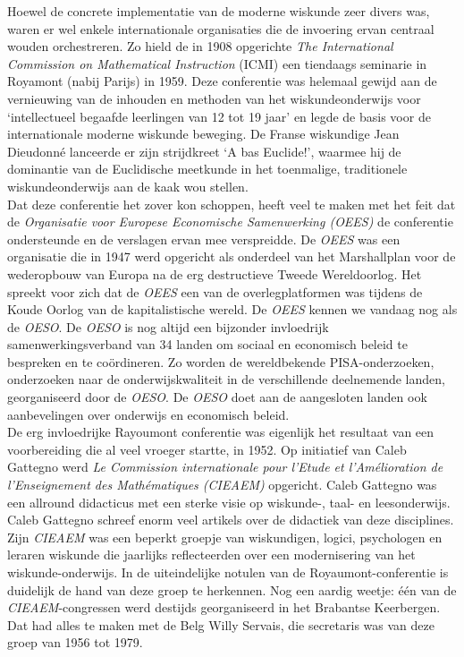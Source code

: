 \documentclass[a4paper,11pt]{article}
\begin{document}
\noindent Hoewel de concrete implementatie van de moderne wiskunde zeer divers was,  
waren er wel enkele internationale organisaties die de invoering ervan centraal 
wouden orchestreren. Zo hield de in 1908 opgerichte \textit{The International Commission on Mathematical 
Instruction} (ICMI) een tiendaags seminarie in Royamont (nabij Parijs) in 1959. Deze conferentie was helemaal
gewijd aan de vernieuwing van de inhouden en methoden van het wiskundeonderwijs voor `intellectueel begaafde leerlingen van 12 tot 19 jaar' en legde de 
basis voor de internationale moderne wiskunde beweging. De Franse wiskundige Jean Dieudonné lanceerde er 
zijn strijdkreet `A bas Euclide!', waarmee hij de dominantie van de Euclidische meetkunde in het toenmalige, traditionele
wiskundeonderwijs aan de kaak wou stellen.\\

\noindent Dat deze conferentie 
het zover kon schoppen, heeft veel te maken met het feit dat de \textit{Organisatie voor Europese Economische Samenwerking (OEES)}
de conferentie ondersteunde en de verslagen ervan mee verspreidde. De \textit{OEES} was 
een organisatie die in 1947 werd opgericht als onderdeel van het Marshallplan 
voor de wederopbouw van Europa na de erg destructieve Tweede Wereldoorlog. Het spreekt
voor zich dat de \textit{OEES} een van de overlegplatformen was tijdens de Koude Oorlog
van de kapitalistische wereld. De \textit{OEES} 
kennen we vandaag nog als de \textit{OESO}. De \textit{OESO} is nog altijd een bijzonder 
invloedrijk samenwerkingsverband van 34 landen om sociaal en economisch beleid 
te bespreken en te coördineren. Zo worden de wereldbekende PISA-onderzoeken, 
onderzoeken naar de onderwijskwaliteit in de verschillende deelnemende landen, 
georganiseerd door de \textit{OESO}. De \textit{OESO} doet aan de aangesloten landen ook aanbevelingen over
onderwijs en economisch beleid.\\

\noindent De erg invloedrijke Rayoumont conferentie was eigenlijk het resultaat
van een voorbereiding die al veel vroeger startte, in 1952. Op initiatief van 
Caleb Gattegno werd \textit{Le Commission internationale pour l'Etude et l'Amélioration 
de l'Enseignement des Mathématiques (CIEAEM)} opgericht. Caleb Gattegno was een 
allround didacticus met een sterke visie op wiskunde-, taal- en leesonderwijs. 
Caleb Gattegno schreef enorm veel artikels over de didactiek van deze 
disciplines. Zijn \textit{CIEAEM} was een beperkt groepje van wiskundigen, logici, 
psychologen en leraren wiskunde die jaarlijks reflecteerden over een 
modernisering van het wiskunde-onderwijs. In de uiteindelijke notulen van de 
Royaumont-conferentie is duidelijk de hand van deze groep te herkennen. Nog een 
aardig weetje: één van de \textit{CIEAEM}-congressen werd destijds georganiseerd in 
het Brabantse Keerbergen. Dat had alles te maken met de Belg Willy Servais, die 
secretaris was van deze groep van 1956 tot 1979.\\
\end{document}
